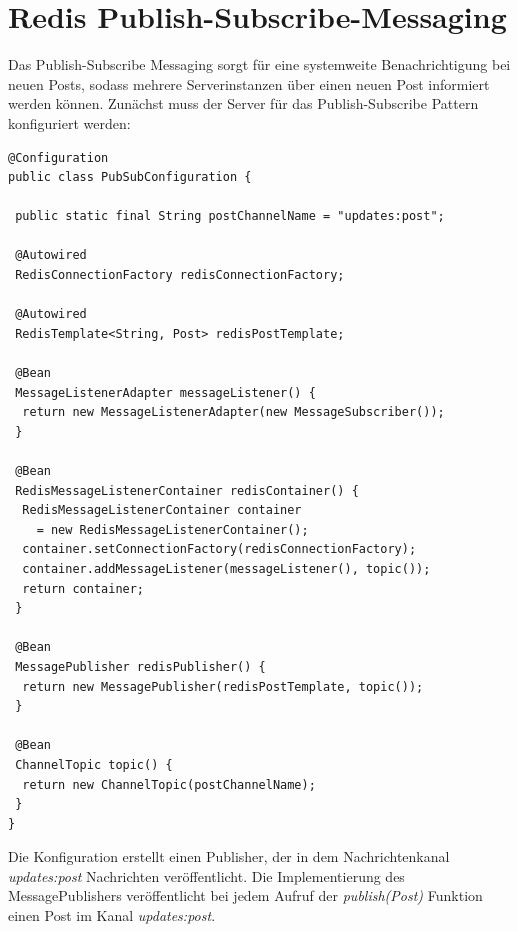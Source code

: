 \documentclass[
    a4paper
]{scrreprt}
\begin{document}
	\section{Redis Publish-Subscribe-Messaging}
	Das Publish-Subscribe Messaging sorgt für eine systemweite Benachrichtigung bei neuen Posts, sodass mehrere Serverinstanzen über einen neuen Post informiert werden können. 
	Zunächst muss der Server für das Publish-Subscribe Pattern konfiguriert werden:
	\begin{lstlisting}
@Configuration
public class PubSubConfiguration {

 public static final String postChannelName = "updates:post";

 @Autowired
 RedisConnectionFactory redisConnectionFactory;

 @Autowired
 RedisTemplate<String, Post> redisPostTemplate;

 @Bean
 MessageListenerAdapter messageListener() {
  return new MessageListenerAdapter(new MessageSubscriber());
 }

 @Bean
 RedisMessageListenerContainer redisContainer() {
  RedisMessageListenerContainer container
    = new RedisMessageListenerContainer();
  container.setConnectionFactory(redisConnectionFactory);
  container.addMessageListener(messageListener(), topic());
  return container;
 }

 @Bean
 MessagePublisher redisPublisher() {
  return new MessagePublisher(redisPostTemplate, topic());
 }

 @Bean
 ChannelTopic topic() {
  return new ChannelTopic(postChannelName);
 }
}
	\end{lstlisting}
	Die Konfiguration erstellt einen Publisher, der in dem Nachrichtenkanal \textit{updates:post} Nachrichten veröffentlicht. Die Implementierung des MessagePublishers veröffentlicht bei jedem Aufruf der \textit{publish(Post)} Funktion einen Post im Kanal \textit{updates:post}.
	
\end{document}
